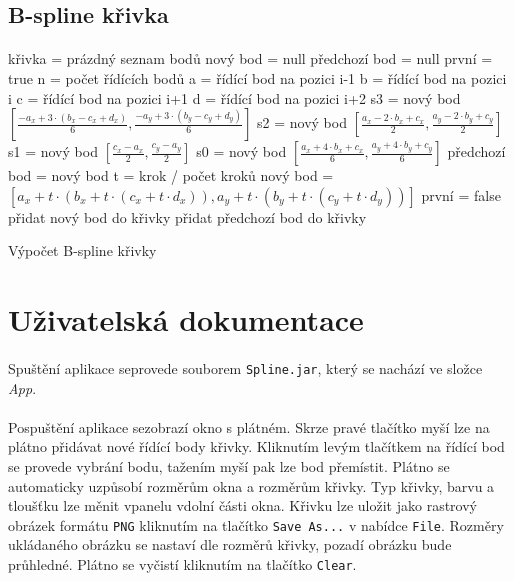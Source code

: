 \documentclass[12pt]{scrartcl}
\begin{document}
\subsection{B-spline křivka}
\paragraph{}
\begin{algorithm}[H]
	křivka = prázdný seznam bodů\;
	nový bod = null\;
	předchozí bod = null\;
	první = true\;
	n = počet řídících bodů\;
	 {
		a = řídící bod na pozici i-1\;
		b = řídící bod na pozici i\;
		c = řídící bod na pozici i+1\;
		d = řídící bod na pozici i+2\;
		s3 = nový bod $\left[ \frac{-a_x + 3 \cdot (b_x - c_x + d_x)}{6}, \frac{-a_y + 3 \cdot (b_y - c_y + d_y)}{6} \right] $\;
		s2 = nový bod $\left[ \frac{a_x - 2 \cdot b_x + c_x}{2}, \frac{a_y - 2 \cdot b_y + c_y}{2} \right] $\;		
		s1 = nový bod $\left[ \frac{c_x - a_x}{2}, \frac{c_y - a_y}{2} \right] $\;				
		s0 = nový bod $\left[ \frac{a_x + 4 \cdot b_x + c_x}{6}, \frac{a_y + 4 \cdot b_y + c_y}{6} \right] $\;			
		 {
			předchozí bod = nový bod\;
			t = krok / počet kroků\;
			nový bod = $\left[ a_x + t \cdot \left( b_x + t \cdot \left( c_x + t \cdot d_x \right) \right), a_y + t \cdot \left( b_y + t \cdot \left( c_y + t \cdot d_y \right) \right) \right] $\;
			{
			první = false\;
			}
			{
				přidat nový bod do křivky\;
				přidat předchozí bod do křivky\;
			}
		}
	}
 \caption{Výpočet B-spline křivky}
\end{algorithm}

\newpage
\section{Uživatelská dokumentace}

\paragraph{}
Spuštění aplikace se\nobreakspace provede souborem \texttt{Spline.jar}, který se nachází ve složce \emph{App}.

\paragraph{}
Po\nobreakspace spuštění aplikace se\nobreakspace zobrazí okno s plátném. Skrze pravé tlačítko myší lze na plátno přidávat nové řídící body křivky. Kliknutím levým tlačítkem na řídící bod se provede vybrání bodu, tažením myší pak lze bod přemístit. Plátno se automaticky uzpůsobí rozměrům okna a rozměrům křivky. Typ křivky, barvu a tloušťku lze měnit v\nobreakspace panelu v\nobreakspace dolní části okna. Křivku lze uložit jako rastrový obrázek formátu \texttt{PNG} kliknutím na tlačítko \texttt{Save As...} v nabídce \texttt{File}. Rozměry ukládaného obrázku se nastaví dle rozměrů křivky, pozadí obrázku bude průhledné. Plátno se vyčistí kliknutím na tlačítko \texttt{Clear}.
\end{document}
